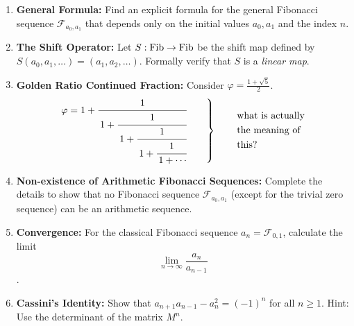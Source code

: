 \begin{exercise}
\begin{enumerate}
    \item \textbf{General Formula:} Find an explicit formula for the general Fibonacci sequence $\mathcal{F}_{a_0, a_1}$ that depends only on the initial values $a_0, a_1$ and the index $n$.
    \item \textbf{The Shift Operator:} Let $S: \operatorname{Fib} \to \operatorname{Fib}$ be the shift map defined by $S(a_0, a_1, \dots) = (a_1, a_2, \dots)$. Formally verify that $S$ is a \textit{linear map}.
    \item \textbf{Golden Ratio Continued Fraction:} Consider $\varphi = \frac{1+\sqrt{5}}{2}$.
        \[
        \left.
        \begin{aligned}
        \varphi
        = 1+\cfrac{1}{\,1+\cfrac{1}{\,1+\cfrac{1}{\,1+\cfrac{1}{\,1+\cdots}}}}
        \end{aligned}
        \qquad
        \right\}
        \qquad
        \left.
        \begin{aligned}
        &\text{what is actually}\\
        &\text{the meaning of}\\
        &\text{this?}
        \end{aligned}
        \right.
        \]
    \item \textbf{Non-existence of Arithmetic Fibonacci Sequences:} Complete the details to show that no Fibonacci sequence $\mathcal{F}_{a_0, a_1}$ (except for the trivial zero sequence) can be an arithmetic sequence.
    \item \textbf{Convergence:} For the classical Fibonacci sequence $a_n = \mathcal{F}_{0,1}$, calculate the limit \[\lim_{n \to \infty} \frac{a_n}{a_{n-1}}\].
    \item \textbf{Cassini's Identity:} Show that $a_{n+1} a_{n-1} - a_n^2 = (-1)^n$ for all $n \ge 1$. Hint: Use the determinant of the matrix $M^n$.
\end{enumerate}
\end{exercise}